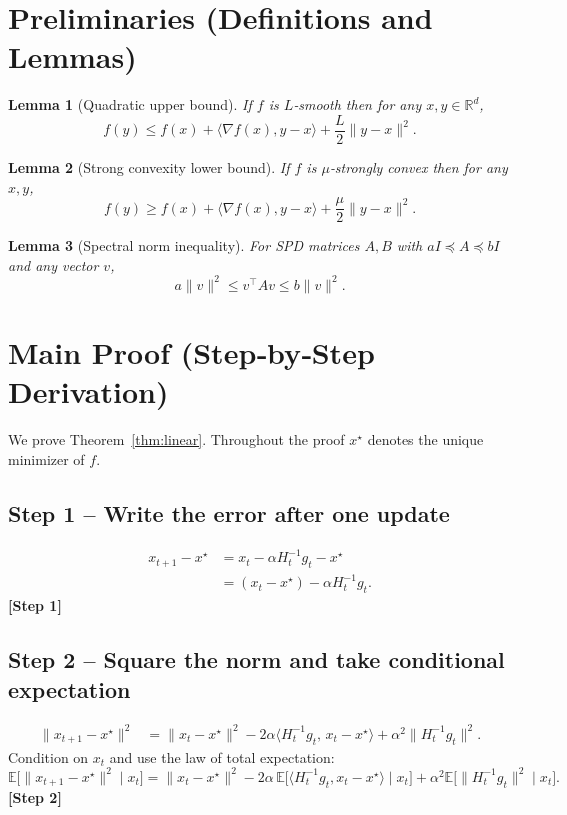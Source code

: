 \documentclass[11pt]{article}
\newtheorem{lemma}{Lemma}[section]
\begin{document}
\section{Preliminaries (Definitions and Lemmas)}
\begin{lemma}[Quadratic upper bound]\label{lem:smooth}
If $f$ is $L$‑smooth then for any $x,y\in\mathbb{R}^{d}$,
\[
f(y)\le f(x)+\langle\nabla f(x),y-x\rangle+\frac{L}{2}\|y-x\|^{2}.
\]
\end{lemma}
\begin{lemma}[Strong convexity lower bound]\label{lem:strong}
If $f$ is $\mu$‑strongly convex then for any $x,y$,
\[
f(y)\ge f(x)+\langle\nabla f(x),y-x\rangle+\frac{\mu}{2}\|y-x\|^{2}.
\]
\end{lemma}
\begin{lemma}[Spectral norm inequality]\label{lem:spectral}
For SPD matrices $A,B$ with $a I\preceq A\preceq b I$ and any vector $v$,
\[
a\|v\|^{2}\le v^{\top} A v\le b\|v\|^{2}.
\]
\end{lemma}

\section{Main Proof (Step‑by‑Step Derivation)}
We prove Theorem~\ref{thm:linear}.  Throughout the proof $x^{\star}$ denotes the unique
minimizer of $f$.

\subsection*{Step 1 – Write the error after one update}
\begin{align}
x_{t+1}-x^{\star}
&=x_{t}-\alpha H_{t}^{-1}g_{t}-x^{\star} \nonumber\\
&=(x_{t}-x^{\star})-\alpha H_{t}^{-1}g_{t}. \tag{1}
\end{align}
\textbf{[Step 1]}

\subsection*{Step 2 – Square the norm and take conditional expectation}
\begin{align}
\|x_{t+1}-x^{\star}\|^{2}
&=\|x_{t}-x^{\star}\|^{2}
-2\alpha\langle H_{t}^{-1}g_{t},\,x_{t}-x^{\star}\rangle
+\alpha^{2}\|H_{t}^{-1}g_{t}\|^{2}. \tag{2}
\end{align}
Condition on $x_{t}$ and use the law of total expectation:
\[
\mathbb{E}\!\bigl[\|x_{t+1}-x^{\star}\|^{2}\mid x_{t}\bigr]
= \|x_{t}-x^{\star}\|^{2}
-2\alpha\,\mathbb{E}\!\bigl[\langle H_{t}^{-1}g_{t},x_{t}-x^{\star}\rangle\mid x_{t}\bigr]
+\alpha^{2}\mathbb{E}\!\bigl[\|H_{t}^{-1}g_{t}\|^{2}\mid x_{t}\bigr].
\tag{3}
\]
\textbf{[Step 2]}
\end{document}
